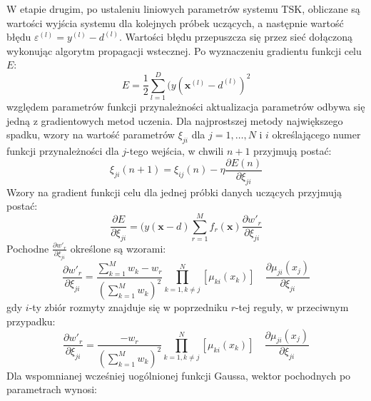\documentclass[a4paper,12pt,titlepage]{article}
\begin{document}
W etapie drugim, po ustaleniu liniowych parametrów systemu TSK, obliczane są wartości wyjścia systemu dla kolejnych próbek uczących, a następnie wartość błędu \hbox{$\varepsilon ^{(l)} = y^{(l)} - d^{(l)}$}. Wartości błędu przepuszcza się przez sieć dołączoną wykonując algorytm propagacji wstecznej. Po wyznaczeniu gradientu funkcji celu $E$:
\begin{equation}
E = \frac{1}{2}\sum_{l=1}^{D}(y(\mathbf{x}^{(l)} - d^{(l)})^2
\end{equation}
względem parametrów funkcji przynależności aktualizacja parametrów odbywa się jedną z gradientowych metod uczenia. Dla najprostszej metody największego spadku, wzory na wartość parametrów $\xi _{ji}$ dla $j = 1,\ldots,N$ i $i$ określającego numer funkcji przynależności dla $j$-tego wejścia, w chwili $n+1$ przyjmują postać:
\begin{equation}
\xi _{ji}(n+1) = \xi _{ij}(n) - \eta \frac{\partial E(n)}{\partial \xi _{ji}}
\end{equation}
Wzory na gradient funkcji celu dla jednej próbki danych uczących przyjmują postać:
\begin{equation}
\frac{\partial E}{\partial \xi _{ji}} = (y(\mathbf{x} - d)\sum_{r=1}^M f_r(\mathbf{x})\frac{\partial w'_r}{\partial \xi _{ji}}
\end{equation}
Pochodne $\frac{\partial w'_r}{\partial \xi _{ji}}$ określone są wzorami:
\begin{equation}
\frac{\partial w'_r}{\partial \xi _{ji}} = \frac{\sum_{k=1}^M w_k - w_r}{(\sum_{k=1}^M w_k)^2} \prod_{k=1, k \neq j}^N [\mu _{ki}(x_k)] \quad \frac{\partial \mu _{ji} (x_j)}{\partial \xi _{ji}}
\end{equation}
gdy $i$-ty zbiór rozmyty znajduje się w poprzedniku $r$-tej reguły, w przeciwnym przypadku:
\begin{equation}
\frac{\partial w'_r}{\partial \xi _{ji}} = \frac{- w_r}{(\sum_{k=1}^M w_k)^2} \prod_{k=1, k \neq j}^N [\mu _{ki}(x_k)] \quad \frac{\partial \mu _{ji} (x_j)}{\partial \xi _{ji}}
\end{equation}
Dla wspomnianej wcześniej uogólnionej funkcji Gaussa, wektor pochodnych po parametrach wynosi:
\end{document}
